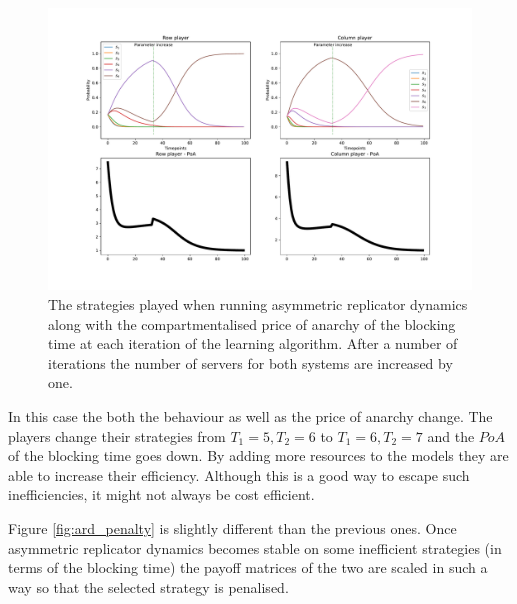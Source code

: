 \begin{figure}[H]
    \includegraphics[width=\textwidth, trim=0 400 0 0]{imgs/asymmetric_rd_and_PoA/asymmetric_increase_C.pdf}
    \caption{
        The strategies played when running asymmetric replicator dynamics
        along with the compartmentalised price of anarchy of the blocking time 
        at each iteration of the learning algorithm. After a number of 
        iterations the number of servers for both systems are increased by one.
    }
    \label{fig:ard_num_of_servers}
\end{figure}

In this case the both the behaviour as well as the price of anarchy change.
The players change their strategies from \(T_1 = 5, T_2 = 6\) to 
\(T_1 = 6, T_2 = 7\) and the \(PoA\) of the blocking time goes down.
By adding more resources to the models they are able to increase their 
efficiency.
Although this is a good way to escape such inefficiencies, it might not always
be cost efficient.

Figure \ref{fig:ard_penalty} is slightly different than the previous ones.
Once asymmetric replicator dynamics becomes stable on some inefficient 
strategies (in terms of the blocking time) the payoff matrices of the two are
scaled in such a way so that the selected strategy is penalised.

